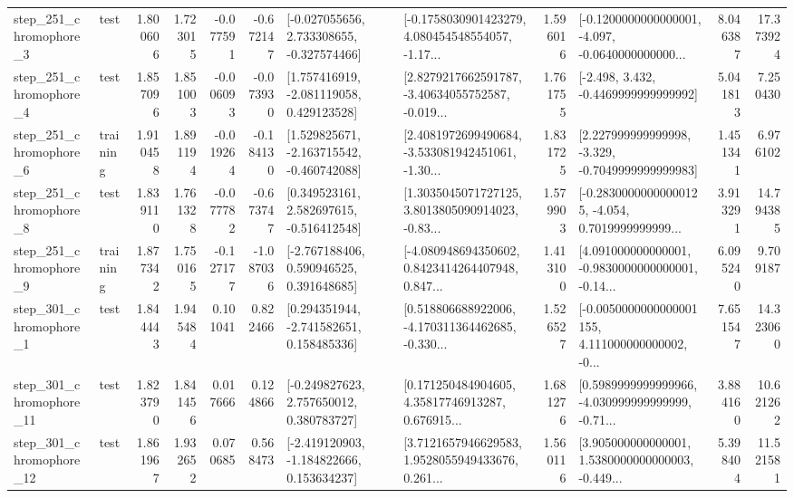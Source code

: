\begin{tabular}{llrrrrllrlrr}
   step\_251\_chromophore\_3 &      test &      1.800606 &    1.723015 &     -0.077591 & -0.672147 &   [-0.027055656, 2.733308655, -0.327574466] &  [-0.1758030901423279, 4.080454548554057, -1.17... &       1.596016 &  [-0.1200000000000001, -4.097, -0.0640000000000... &            8.046387 &         17.373924 \\
   step\_251\_chromophore\_4 &      test &      1.857096 &    1.851003 &     -0.006093 & -0.073930 &    [1.757416919, -2.081119058, 0.429123528] &  [2.8279217662591787, -3.40634055752587, -0.019... &       1.761755 &               [-2.498, 3.432, -0.4469999999999992] &            5.041813 &          7.250430 \\
   step\_251\_chromophore\_6 &  training &      1.910458 &    1.891194 &     -0.019264 & -0.184130 &   [1.529825671, -2.163715542, -0.460742088] &  [2.4081972699490684, -3.533081942451061, -1.30... &       1.831725 &   [2.227999999999998, -3.329, -0.7049999999999983] &            1.451341 &          6.976102 \\
   step\_251\_chromophore\_8 &      test &      1.839110 &    1.761328 &     -0.077782 & -0.673747 &    [0.349523161, 2.582697615, -0.516412548] &  [1.3035045071727125, 3.8013805090914023, -0.83... &       1.579903 &  [-0.28300000000000125, -4.054, 0.7019999999999... &            3.913291 &         14.794385 \\
   step\_251\_chromophore\_9 &  training &      1.877342 &    1.750165 &     -0.127177 & -1.087036 &    [-2.767188406, 0.590946525, 0.391648685] &  [-4.080948694350602, 0.8423414264407948, 0.847... &       1.413100 &  [4.091000000000001, -0.9830000000000001, -0.14... &            6.095240 &          9.709187 \\
   step\_301\_chromophore\_1 &      test &      1.844443 &    1.945484 &      0.101041 &  0.822466 &    [0.294351944, -2.741582651, 0.158485336] &  [0.518806688922006, -4.170311364462685, -0.330... &       1.526527 &  [-0.0050000000000001155, 4.111000000000002, -0... &            7.651547 &         14.323060 \\
  step\_301\_chromophore\_11 &      test &      1.823790 &    1.841456 &      0.017666 &  0.124866 &    [-0.249827623, 2.757650012, 0.380783727] &  [0.171250484904605, 4.35817746913287, 0.676915... &       1.681276 &  [0.5989999999999966, -4.030999999999999, -0.71... &            3.884160 &         10.621262 \\
  step\_301\_chromophore\_12 &      test &      1.861967 &    1.932652 &      0.070685 &  0.568473 &   [-2.419120903, -1.184822666, 0.153634237] &  [3.7121657946629583, 1.9528055949433676, 0.261... &       1.560116 &  [3.905000000000001, 1.5380000000000003, -0.449... &            5.398404 &         11.521581 \\

\end{tabular}
